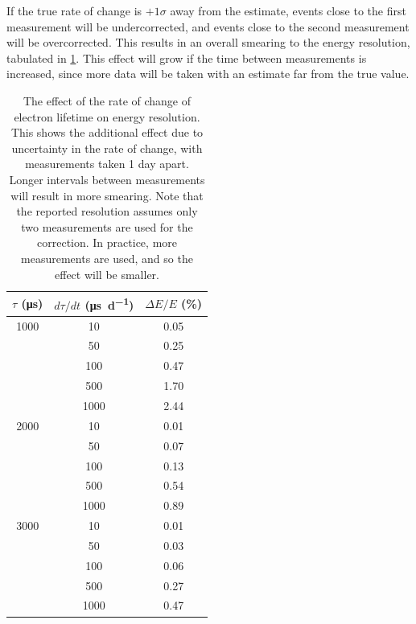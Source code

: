 \documentclass[herrin-thesis.tex]{subfiles}
\begin{document}
If the true rate of change is \(+1\sigma\) away from the estimate, events close to the first measurement will be undercorrected, and events close to the second measurement will be overcorrected. This results in an overall smearing to the energy resolution, tabulated in \cref{tab:el_res_dtaudt}. This effect will grow if the time between measurements is increased, since more data will be taken with an estimate far from the true value.

\begin{table}[htd]
\centering
\caption[Electron lifetime time variance effect on resolution]{The effect of the rate of change of electron lifetime on energy resolution. This shows the additional effect due to uncertainty in the rate of change, with measurements taken 1 day apart. Longer intervals between measurements will result in more smearing. Note that the reported resolution assumes only two measurements are used for the correction. In practice, more measurements are used, and so the effect will be smaller.}
\label{tab:el_res_dtaudt}
\begin{tabular}{c|c|c}
	\(\tau\) (\si{\micro\second})	&	\(d\tau/dt\) (\si{\micro\second\per\day})	&	\(\Delta E / E\) (\%) 	\\ \hline
	1000					&	10			&	0.05				\\
						&	50			&	0.25				\\
						&	100			&	0.47				\\
						&	500			&	1.70				\\
						&	1000			&	2.44				\\ \hline
	2000					&	10			&	0.01				\\
						&	50			&	0.07				\\
						&	100			&	0.13				\\
						&	500			&	0.54				\\
						&	1000			&	0.89				\\ \hline
	3000					&	10			&	0.01				\\
						&	50			&	0.03				\\
						&	100			&	0.06				\\
						&	500			&	0.27				\\
						&	1000			&	0.47
\end{tabular}
\end{table}
\end{document}
